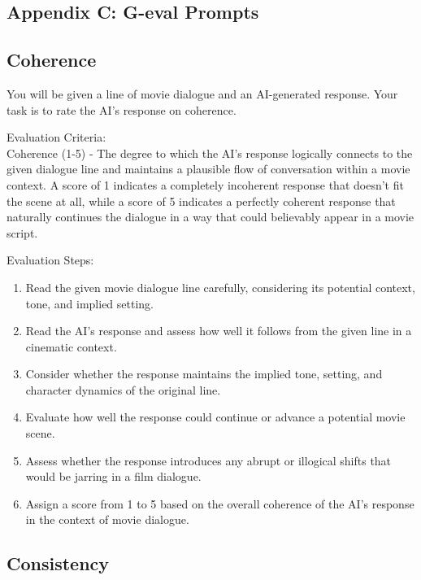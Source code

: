\documentclass[stu,donotrepeattitle,floatsintext]{apa7}
\begin{document}
\begin{appendices}
        \section{Appendix C: G-eval Prompts}\label{sec:g-eval-prompts}
        \subsection{Coherence}\label{subsec:g-eval-coherence}

        \noindent You will be given a line of movie dialogue and an AI-generated response.
        Your task is to rate the AI's response on coherence.

        \bigskip
        \noindent Evaluation Criteria:\\
        \noindent Coherence (1-5) - The degree to which the AI's response logically connects to the given dialogue line and maintains a plausible flow of conversation within a movie context.
        A score of 1 indicates a completely incoherent response that doesn't fit the scene at all, while a score of 5 indicates a perfectly coherent response that naturally continues the dialogue in a way that could believably appear in a movie script.

        \bigskip
        \noindent Evaluation Steps:
        \begin{enumerate}
            \item Read the given movie dialogue line carefully, considering its potential context, tone, and implied setting.
            \item Read the AI's response and assess how well it follows from the given line in a cinematic context.
            \item Consider whether the response maintains the implied tone, setting, and character dynamics of the original line.
            \item Evaluate how well the response could continue or advance a potential movie scene.
            \item Assess whether the response introduces any abrupt or illogical shifts that would be jarring in a film dialogue.
            \item Assign a score from 1 to 5 based on the overall coherence of the AI's response in the context of movie dialogue.
        \end{enumerate}

        \subsection{Consistency}\label{subsec:g-eval-consistency}


\end{appendices}
\end{document}
